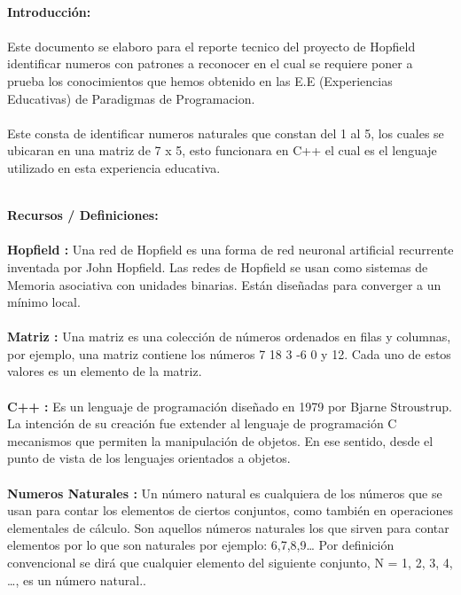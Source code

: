 \documentclass[40pt]{article}
\begin{document}
\newpage

\maketitle
\textsf{\ \\
\textbf{Introducción:}\\
\\
Este documento se elaboro para el reporte tecnico del proyecto de Hopfield identificar numeros con patrones a reconocer en el cual se requiere poner a prueba los conocimientos que hemos obtenido en las E.E (Experiencias Educativas) de Paradigmas de Programacion.\\
\\
Este consta de identificar numeros naturales que constan del 1 al 5, los cuales se ubicaran en una matriz de 7 x 5, esto funcionara en C++ el cual es el lenguaje utilizado en esta experiencia educativa. \\}

\maketitle
\textsf{\ \\
\textbf{Recursos / Definiciones:}\\
\\
\textbf{Hopfield :} Una red de Hopfield es una forma de red neuronal artificial recurrente inventada por John Hopfield. Las redes de Hopfield se usan como sistemas de Memoria asociativa con unidades binarias. Están diseñadas para converger a un mínimo local.
\\
\\
\textbf{Matriz :} Una matriz es una colección de números ordenados en filas y columnas, por ejemplo, una matriz contiene los números 7 18 3 -6 0 y 12. Cada uno de estos valores es un elemento de la matriz.
\\
\\
\textbf{C++ :} Es un lenguaje de programación diseñado en 1979 por Bjarne Stroustrup. La intención de su creación fue extender al lenguaje de programación C mecanismos que permiten la manipulación de objetos. En ese sentido, desde el punto de vista de los lenguajes orientados a objetos.
\\
\\
\textbf{Numeros Naturales :} Un número natural es cualquiera de los números que se usan para contar los elementos de ciertos conjuntos, como también en operaciones elementales de cálculo. Son aquellos números naturales los que sirven para contar elementos por lo que son naturales por ejemplo: 6,7,8,9… Por definición convencional se dirá que cualquier elemento del siguiente conjunto, N = {1, 2, 3, 4, …}, es un número natural.. \\}
\end{document}
